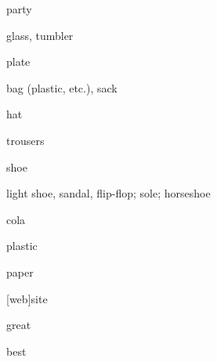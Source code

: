 \begin{flashcard}{\LARGE party}
\LARGE {}
\end{flashcard}
\begin{flashcard}{\LARGE glass, tumbler}
\LARGE {}
\end{flashcard}
\begin{flashcard}{\LARGE plate}
\LARGE {}
\end{flashcard}
\begin{flashcard}{\LARGE bag (plastic, etc.), sack}
\LARGE {}
\end{flashcard}
\begin{flashcard}{\LARGE hat}
\LARGE {}
\end{flashcard}
\begin{flashcard}{\LARGE trousers}
\LARGE {}
\end{flashcard}
\begin{flashcard}{\LARGE shoe}
\LARGE {}
\end{flashcard}
\begin{flashcard}{\LARGE light shoe, sandal, flip-flop; sole; horseshoe}
\LARGE {}
\end{flashcard}
\begin{flashcard}{\LARGE cola}
\LARGE {}
\end{flashcard}
\begin{flashcard}{\LARGE plastic}
\LARGE {}
\end{flashcard}
\begin{flashcard}{\LARGE paper}
\LARGE {}
\end{flashcard}
\begin{flashcard}{\LARGE {[}web{]}site}
\LARGE {}
\end{flashcard}
\begin{flashcard}{\LARGE great}
\LARGE {}
\end{flashcard}
\begin{flashcard}{\LARGE best}
\LARGE {}
\end{flashcard}
